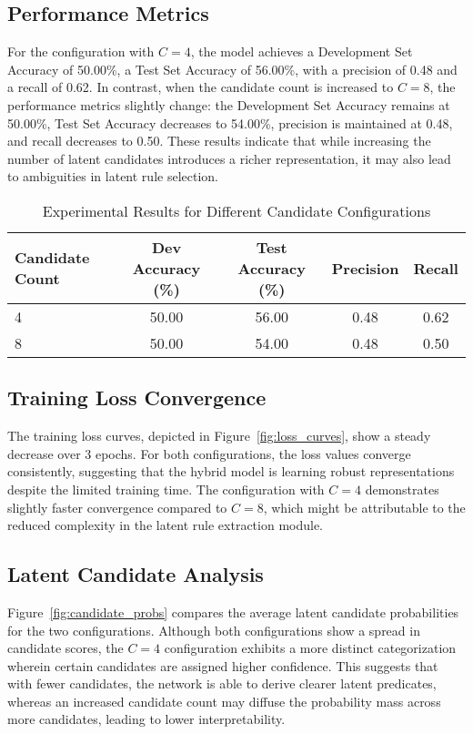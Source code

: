 \documentclass[11pt]{article}
\begin{document}
\subsection{Performance Metrics}
For the configuration with \(C=4\), the model achieves a Development Set Accuracy of 50.00\%, a Test Set Accuracy of 56.00\%, with a precision of 0.48 and a recall of 0.62. In contrast, when the candidate count is increased to \(C=8\), the performance metrics slightly change: the Development Set Accuracy remains at 50.00\%, Test Set Accuracy decreases to 54.00\%, precision is maintained at 0.48, and recall decreases to 0.50. These results indicate that while increasing the number of latent candidates introduces a richer representation, it may also lead to ambiguities in latent rule selection.

\begin{table}[h]
\centering
\caption{Experimental Results for Different Candidate Configurations}
\label{tab:results}
\begin{tabular}{lcccc}
\toprule
Candidate Count & Dev Accuracy (\%) & Test Accuracy (\%) & Precision & Recall \\
\midrule
4 & 50.00 & 56.00 & 0.48 & 0.62 \\
8 & 50.00 & 54.00 & 0.48 & 0.50 \\
\bottomrule
\end{tabular}
\end{table}

\subsection{Training Loss Convergence}
The training loss curves, depicted in Figure~\ref{fig:loss_curves}, show a steady decrease over 3 epochs. For both configurations, the loss values converge consistently, suggesting that the hybrid model is learning robust representations despite the limited training time. The configuration with \(C=4\) demonstrates slightly faster convergence compared to \(C=8\), which might be attributable to the reduced complexity in the latent rule extraction module.

\subsection{Latent Candidate Analysis}
Figure~\ref{fig:candidate_probs} compares the average latent candidate probabilities for the two configurations. Although both configurations show a spread in candidate scores, the \(C=4\) configuration exhibits a more distinct categorization wherein certain candidates are assigned higher confidence. This suggests that with fewer candidates, the network is able to derive clearer latent predicates, whereas an increased candidate count may diffuse the probability mass across more candidates, leading to lower interpretability.
\end{document}
